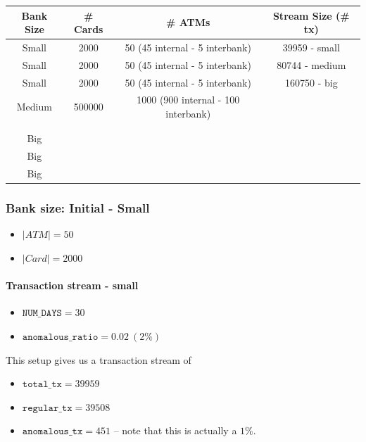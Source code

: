 \begin{table}[H]
\centering
\begin{tabular}{|c|c|c|c|}
\hline
Bank Size & \# Cards & \# ATMs & Stream Size (\# tx) \\ \hline
Small     & 2000     & 50 (45 internal - 5 interbank)     & 39959 - small       \\ \hline
Small     & 2000     & 50 (45 internal - 5 interbank)      & 80744 - medium      \\ \hline
Small     & 2000     & 50 (45 internal - 5 interbank)     & 160750 - big        \\ \hline
Medium    & 500000   & 1000 (900 internal - 100 interbank)   &                     \\ \hline
          &          &         &                     \\ \hline
          &          &         &                     \\ \hline
Big       &          &         &                     \\ \hline
Big       &          &         &                     \\ \hline
Big       &          &         &                     \\ \hline
\end{tabular}
\end{table}

\subsubsection{Bank size: Initial - Small}

\begin{itemize}
  \item $|ATM| = 50$
  \item $|Card| = 2000$
\end{itemize}

\paragraph{Transaction stream - small\\}

\begin{itemize}
  \item $\texttt{NUM\_DAYS} = 30$
  \item $\texttt{anomalous\_ratio} = 0.02\ (2\%)$ 
\end{itemize}

This setup gives us a transaction stream of 
\begin{itemize}
  \item $\texttt{total\_tx} = 39959$
  \item $\texttt{regular\_tx} = 39508$
  \item $\texttt{anomalous\_tx} = 451$ -- note that this is actually a $1\%$.
\end{itemize}

